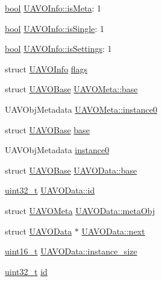 \begin{DoxyCompactItemize}
\item 
\hyperlink{group___exported__types_gaf6a258d8f3ee5206d682d799316314b1}{bool} \hyperlink{group___u_a_v_ga6d180f678afa491a14a13dccf7a6916d}{U\-A\-V\-O\-Info\-::is\-Meta}\-: 1
\item 
\hyperlink{group___exported__types_gaf6a258d8f3ee5206d682d799316314b1}{bool} \hyperlink{group___u_a_v_gac17e3b9e0eaf982bbbba5545026f7bb4}{U\-A\-V\-O\-Info\-::is\-Single}\-: 1
\item 
\hyperlink{group___exported__types_gaf6a258d8f3ee5206d682d799316314b1}{bool} \hyperlink{group___u_a_v_ga18d192ef3b73129422653ea96a697711}{U\-A\-V\-O\-Info\-::is\-Settings}\-: 1
\item 
struct \hyperlink{struct_u_a_v_o_info}{U\-A\-V\-O\-Info} \hyperlink{group___u_a_v_ga89997860157be94711355010fc2a337d}{flags}
\item 
struct \hyperlink{struct_u_a_v_o_base}{U\-A\-V\-O\-Base} \hyperlink{group___u_a_v_gadaee40988f6887dd12b46918c829466e}{U\-A\-V\-O\-Meta\-::base}
\item 
U\-A\-V\-Obj\-Metadata \hyperlink{group___u_a_v_gae6be2c703c11bc6bb66109a55dd84d9e}{U\-A\-V\-O\-Meta\-::instance0}
\item 
struct \hyperlink{struct_u_a_v_o_base}{U\-A\-V\-O\-Base} \hyperlink{group___u_a_v_gaf41894f299b7a692a649d63f02c30e35}{base}
\item 
U\-A\-V\-Obj\-Metadata \hyperlink{group___u_a_v_ga7ae46078929ae4d2ce2e2d74a4d6bfa9}{instance0}
\item 
struct \hyperlink{struct_u_a_v_o_base}{U\-A\-V\-O\-Base} \hyperlink{group___u_a_v_gacf898b0b5f95119ac33559f504c073cf}{U\-A\-V\-O\-Data\-::base}
\item 
\hyperlink{stdint_8h_a435d1572bf3f880d55459d9805097f62}{uint32\-\_\-t} \hyperlink{group___u_a_v_gaead38a840ec3156c37871e121c202e40}{U\-A\-V\-O\-Data\-::id}
\item 
struct \hyperlink{struct_u_a_v_o_meta}{U\-A\-V\-O\-Meta} \hyperlink{group___u_a_v_ga81dba5fc31f263dc85688f290703f9c5}{U\-A\-V\-O\-Data\-::meta\-Obj}
\item 
struct \hyperlink{struct_u_a_v_o_data}{U\-A\-V\-O\-Data} $\ast$ \hyperlink{group___u_a_v_ga69aa4b26e0e8727f2e9a418f42d056a0}{U\-A\-V\-O\-Data\-::next}
\item 
\hyperlink{stdint_8h_a273cf69d639a59973b6019625df33e30}{uint16\-\_\-t} \hyperlink{group___u_a_v_ga1ba7707e476478c92318fe6589e3dfd9}{U\-A\-V\-O\-Data\-::instance\-\_\-size}
\item 
\hyperlink{stdint_8h_a435d1572bf3f880d55459d9805097f62}{uint32\-\_\-t} \hyperlink{group___u_a_v_gabaabdc509cdaba7df9f56c6c76f3ae19}{id}

\end{DoxyCompactItemize}
